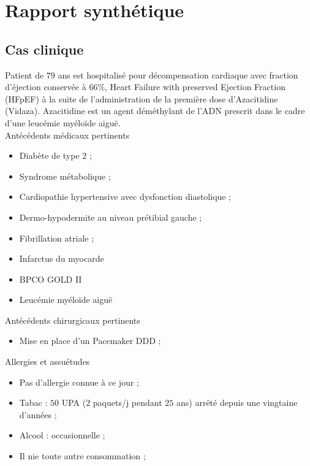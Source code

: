 \section{Rapport synthétique}

\subsection{Cas clinique}
Patient de $79$ ans est hospitalisé pour décompensation cardiaque avec fraction d’éjection conservée à $66$\%, Heart Failure with preserved Ejection Fraction (HFpEF) à la suite de l’administration de la première dose d’Azacitidine (Vidaza). Azacitidine est un agent déméthylant de l’ADN prescrit dans le cadre d’une leucémie myéloïde aiguë.\\

Antécédents médicaux pertinents

\begin{itemize}[label=\textbullet]
    \item Diabète de type $2$ ;
    \item Syndrome métabolique ;
    \item Cardiopathie hypertensive avec dysfonction diastolique  ;
    \item Dermo-hypodermite au niveau prétibial gauche ;
    \item Fibrillation atriale ;
    \item Infarctus du myocarde 
    \item BPCO GOLD II
    \item Leucémie myéloïde aiguë
    \end{itemize}

Antécédents chirurgicaux pertinents

\begin{itemize}[label=\textbullet]
    \item Mise en place d’un Pacemaker DDD ;
    \end{itemize}

Allergies et assuétudes

\begin{itemize}[label=\textbullet]
    \item Pas d’allergie connue à ce jour ;
    \item Tabac : $50$ UPA ($2$ paquets/j pendant $25$ ans) arrêté depuis une vingtaine d’années ;
    \item Alcool : occasionnelle ;
    \item Il nie toute autre consommation ;
    \end{itemize}



